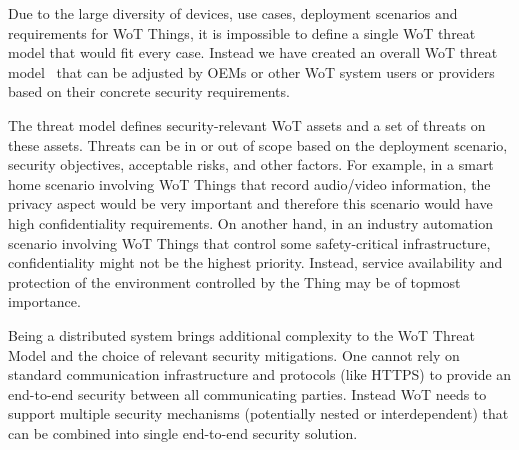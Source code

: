 
Due to the large diversity of devices,
use cases,
deployment scenarios 
and requirements for WoT Things,
it is impossible to define a single WoT threat model
that would fit every case.
Instead we have created an overall WoT threat model~\cite{Wot2017sec} 
that can be adjusted by OEMs or other WoT system users or providers
based on their concrete security requirements.


The threat model defines security-relevant WoT assets 
and a set of threats on these assets.
Threats can be in or out of scope based on the deployment scenario,
security objectives, acceptable risks, and other factors.
For example,
in a smart home scenario involving WoT Things that record audio/video
information, the privacy aspect would be very important and 
therefore this scenario would have high confidentiality requirements.
On another hand,
in an industry automation scenario involving WoT Things that 
control some safety-critical infrastructure,
confidentiality might not be the highest priority.
Instead, service availability
and protection of the environment controlled by the Thing 
may be of topmost importance.

Being a distributed system brings additional complexity 
to the WoT Threat Model and the choice of relevant security mitigations.
One cannot rely on standard communication infrastructure and protocols 
(like HTTPS) to provide an end-to-end security between all communicating
parties.
Instead WoT needs to support multiple security mechanisms 
(potentially nested or interdependent) 
that can be combined into single end-to-end security solution.  
  
